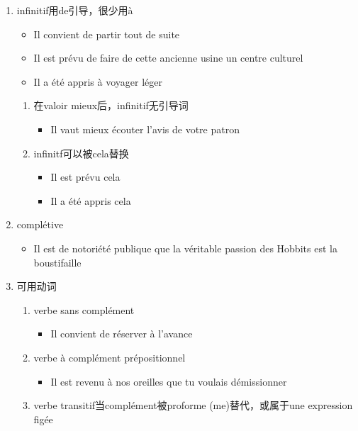 \documentclass[UTF8]{report}
\begin{document}
\begin{enumerate}
    \item infinitif用de引导，很少用à
    \begin{itemize}
        \item Il convient de partir tout de suite
        \item Il est prévu de faire de cette ancienne usine un centre culturel
        \item Il a été appris à voyager léger
    \end{itemize}
    \begin{enumerate}
        \item 在valoir mieux后，infinitif无引导词
        \begin{itemize}
            \item Il vaut mieux écouter l’avis de votre patron
        \end{itemize}
        \item infinitf可以被cela替换
        \begin{itemize}
            \item Il est prévu cela
            \item Il a été appris cela
        \end{itemize}
    \end{enumerate}
    \item complétive
    \begin{itemize}
        \item Il est de notoriété publique que la véritable passion des Hobbits est la boustifaille
    \end{itemize}
    \item 可用动词
    \begin{enumerate}
        \item verbe sans complément
        \begin{itemize}
            \item Il convient de réserver à l’avance
        \end{itemize}
        \item verbe à complément prépositionnel 
        \begin{itemize}
            \item Il est revenu à nos oreilles que tu voulais démissionner
        \end{itemize}
        \item verbe transitif当complément被proforme (me)替代，或属于une expression figée
        \begin{itemize}

\end{itemize}
\end{enumerate}
\end{enumerate}
\end{document}
